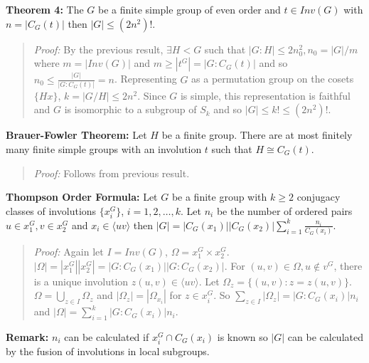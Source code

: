 {\bf Theorem 4:}
The $G$ be a finite simple group of even order and $t \in Inv(G)$ with $n=|C_G(t)|$ then
$|G| \le (2 n^2 )!$.
\begin{quote}
\emph{Proof:}
By the previous result, $\exists H <G$ such that $|G:H| \le 2 n_0^2, n_0=|G|/m$ where
$m=|Inv(G)|$ and $m \ge |t^G|=|G:C_G(t)|$ and so $n_0 \le {\frac {|G|} {|G:C_G(t)|}}=n$.
Representing $G$ as a permutation group on the cosets $\{ Hx \}$, $k=|G/H| \le 2n^2$.  Since
$G$ is simple, this representation is faithful and $G$ is isomorphic to a subgroup of
$S_k$ and so $|G| \le k! \le (2n^2)!$.
\end{quote}
{\bf Brauer-Fowler Theorem:}  Let $H$ be a finite group.   There are at most finitely many
finite simple groups with an involution $t$ such that $H \cong C_G(t)$.
\begin{quote}
\emph{Proof:}
Follows from previous result.
\end{quote}
{\bf Thompson Order Formula:}  Let $G$ be a finite group with $k \ge 2$ conjugacy classes of
involutions $\{x_i^G\}$, $i= 1, 2, \ldots , k$.  Let $n_i$ be the number of ordered pairs
$u \in x_1^G, v \in x_2^G$ and $x_i \in \langle uv \rangle $ then 
$|G|= |C_G(x_1)| |C_G(x_2)| \sum_{i=1}^k {\frac {n_i} {C_G(x_i)}}$.
\begin{quote}
\emph{Proof:}
Again let $I= Inv(G)$, $\Omega= x_1^G \times x_2^G$.
$|\Omega|= |x_1^G| |x_2^G|= |G:C_G(x_1)||G:C_G(x_2)|$.
For $(u,v) \in \Omega, u \notin v^G$, there is a unique involution $z(u,v) \in \langle uv \rangle $.
Let $\Omega_z= \{ (u,v): z=z(u,v) \}$.  $\Omega= \bigcup_{z \in I} \Omega_z$ and
$|\Omega_z|= |\Omega_{x_i}|$ for $z \in x_i^G$.  So $\sum_{z \in I} |\Omega_z| = |G:C_G(x_i)| n_i$
and $|\Omega|= \sum_{i=1}^k |G:C_G(x_i)|n_i$.
\end{quote}
{\bf Remark:} $n_i$ can be calculated if $x_i^G \cap C_G(x_i)$ is known so $|G|$ can be
calculated by the fusion of involutions in local subgroups.
